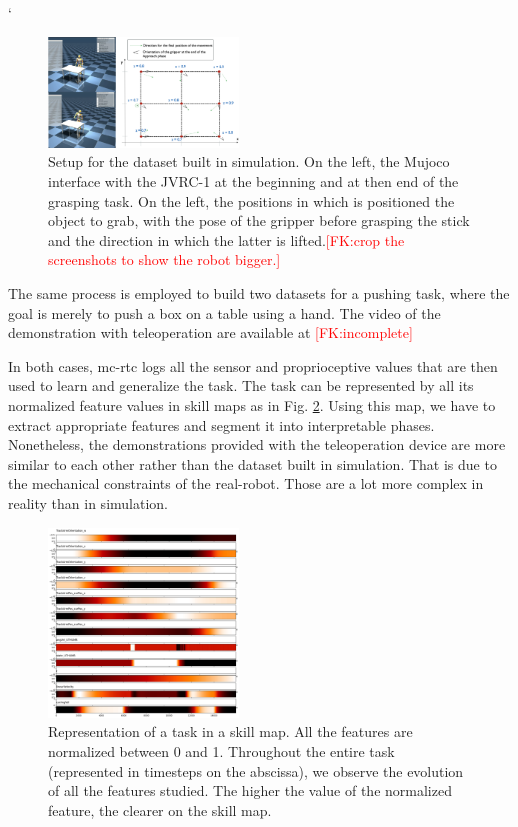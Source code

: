 \documentclass[conference]{IEEEtran}
\newcommand{\fk}[1]{\textcolor{red}{[FK:#1]}}
\begin{document}
 `\begin{figure}[ht]
  \centering
  \includegraphics[width=0.45\textwidth]{img/simSetup4.png}
  \caption{Setup for the dataset built in simulation. On the left, the Mujoco interface with the JVRC-1 \cite{jvrc} at the beginning and at then end of the grasping task. On the left, the positions in which is positioned the object to grab, with the pose of the gripper before grasping the stick and the direction in which the latter is lifted.\fk{crop the screenshots to show the robot bigger.}}
  \label{fig:simSetup}
\end{figure}

 The same process is employed to build two datasets for a pushing task, where the goal is merely to push a box on a table using a hand. The video of the demonstration with teleoperation are available at \fk{incomplete}

 In both cases, mc-rtc logs all the sensor and proprioceptive values that are then used to learn and generalize the task. The task can be represented by all its normalized feature values in skill maps as in Fig. \ref{fig:skillmap}. Using this map, we have to extract appropriate features and segment it into interpretable phases. Nonetheless, the demonstrations provided with the teleoperation device are more similar to each other rather than the dataset built in simulation. That is due to the mechanical constraints of the real-robot. Those are a lot more complex in reality than in simulation.

 \begin{figure}[ht]
  \centering
  \includegraphics[width=0.45\textwidth]{img/skillMap.png}
  \caption{Representation of a task in a skill map. All the features are normalized between 0 and 1. Throughout the entire task (represented in timesteps on the abscissa), we observe the evolution of all the features studied. The higher the value of the normalized feature, the clearer on the skill map.}
  \label{fig:skillmap}
\end{figure}
\end{document}
